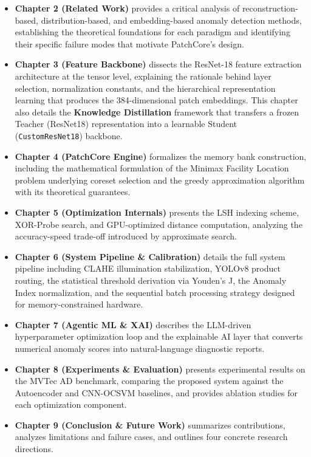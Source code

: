 \begin{itemize}
\item
  \textbf{Chapter 2 (Related Work)} provides a critical analysis of reconstruction-based, distribution-based, and embedding-based anomaly detection methods, establishing the theoretical foundations for each paradigm and identifying their specific failure modes that motivate PatchCore's design.
\item
  \textbf{Chapter 3 (Feature Backbone)} dissects the ResNet-18 feature extraction architecture at the tensor level, explaining the rationale behind layer selection, normalization constants, and the hierarchical representation learning that produces the 384-dimensional patch embeddings. This chapter also details the \textbf{Knowledge Distillation} framework that transfers a frozen Teacher (ResNet18) representation into a learnable Student (\texttt{CustomResNet18}) backbone.
\item
  \textbf{Chapter 4 (PatchCore Engine)} formalizes the memory bank construction, including the mathematical formulation of the Minimax Facility Location problem underlying coreset selection and the greedy approximation algorithm with its theoretical guarantees.
\item
  \textbf{Chapter 5 (Optimization Internals)} presents the LSH indexing scheme, XOR-Probe search, and GPU-optimized distance computation, analyzing the accuracy-speed trade-off introduced by approximate search.
\item
  \textbf{Chapter 6 (System Pipeline \& Calibration)} details the full system pipeline including CLAHE illumination stabilization, YOLOv8 product routing, the statistical threshold derivation via Youden's J, the Anomaly Index normalization, and the sequential batch processing strategy designed for memory-constrained hardware.
\item
  \textbf{Chapter 7 (Agentic ML \& XAI)} describes the LLM-driven hyperparameter optimization loop and the explainable AI layer that converts numerical anomaly scores into natural-language diagnostic reports.
\item
  \textbf{Chapter 8 (Experiments \& Evaluation)} presents experimental results on the MVTec AD benchmark, comparing the proposed system against the Autoencoder and CNN-OCSVM baselines, and provides ablation studies for each optimization component.
\item
  \textbf{Chapter 9 (Conclusion \& Future Work)} summarizes contributions, analyzes limitations and failure cases, and outlines four concrete research directions.
\end{itemize}

